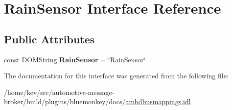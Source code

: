 \hypertarget{interfaceRainSensor}{\section{Rain\+Sensor Interface Reference}
\label{interfaceRainSensor}
}
\subsection*{Public Attributes}
\begin{DoxyCompactItemize}
\item 
\hypertarget{interfaceRainSensor_a4668873f067758b3e28719e815cda204}{const D\+O\+M\+String {\bfseries Rain\+Sensor} = \char`\"{}Rain\+Sensor\char`\"{}}\label{interfaceRainSensor_a4668873f067758b3e28719e815cda204}

\end{DoxyCompactItemize}


The documentation for this interface was generated from the following file\+:\begin{DoxyCompactItemize}
\item 
/home/kev/src/automotive-\/message-\/broker/build/plugins/bluemonkey/docs/\hyperlink{ambdbusmappings_8idl}{ambdbusmappings.\+idl}\end{DoxyCompactItemize}
